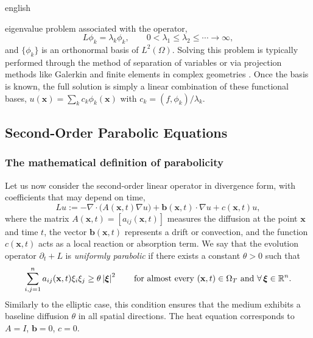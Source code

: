 \begin{hyphenrules}{english}
\begin{enumerate}
    eigenvalue problem associated with the operator,
    \begin{equation}
      L\phi_k=\lambda_k\phi_k,\qquad 0<\lambda_1\le\lambda_2\le\cdots\to\infty,
      \label{eq:eigen}
    \end{equation}
    and $\{\phi_k\}$ is an orthonormal basis of $L^2(\Omega)$. Solving this problem is typically
    performed through the method of separation of variables \cite{evans2010} or via projection
    methods like Galerkin and finite elements in complex geometries \cite{zienkiewicz2013}. Once
    the basis is known, the full solution is simply a linear combination of these functional bases,
    $u(\mathbf{x})=\sum_k c_k\phi_k(\mathbf{x})$ with $c_k=(f,\phi_k)/\lambda_k$.
\end{enumerate}

\subsection{Second-Order Parabolic Equations}\label{subsec:parabolic}

\subsubsection{The mathematical definition of parabolicity}
Let us now consider the second-order linear operator in divergence form, with coefficients that may
depend on time,
\begin{equation}
  Lu:=-\nabla\cdot\big(A(\mathbf{x},t)\nabla u\big)+\mathbf{b}(\mathbf{x},t)\cdot\nabla u+c(\mathbf{x},t)u,
  \label{eq:parabolic-op}
\end{equation}
where the matrix $A(\mathbf{x},t)=[a_{ij}(\mathbf{x},t)]$ measures the diffusion at the point $\mathbf{x}$ and time $t$, the
vector $\mathbf{b}(\mathbf{x},t)$ represents a drift or convection, and the function $c(\mathbf{x},t)$ acts as a local reaction
or absorption term. We say that the evolution operator $\partial_t+L$ is \emph{uniformly parabolic} if
there exists a constant $\theta>0$ such that
\begin{equation}
  \sum_{i,j=1}^{n}a_{ij}(\mathbf{x},t)\xi_i\xi_j\ge\theta\left\lvert \bm\xi \right\rvert^2\qquad
  \text{for almost every }(\mathbf{x},t)\in\Omega_T\text{ and }\forall\,\bm\xi\in\mathbb{R}^n.
  \label{eq:uniform-parabolicity}
\end{equation}
Similarly to the elliptic case, this condition ensures that the medium exhibits a baseline diffusion
$\theta$ in all spatial directions. The heat equation corresponds to $A=I$, $\mathbf{b}=0$, $c=0$.


\end{hyphenrules}
